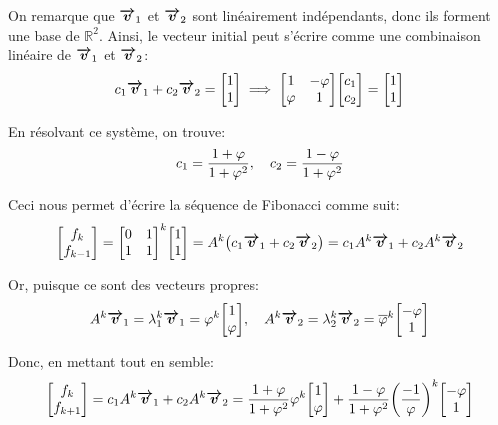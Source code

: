 \documentclass[a4paper]{article}
\begin{document}
{    On remarque que $\bm{\protect\overrightarrow{v}}_1$ et $\bm{\protect\overrightarrow{v}}_2$ sont linéairement indépendants, donc ils forment une base de $\mathbb{R}^2$. Ainsi, le vecteur initial peut s'écrire comme une combinaison linéaire de $\bm{\protect\overrightarrow{v}}_1$ et $\bm{\protect\overrightarrow{v}}_2$: 
    \[c_1 \bvec{v}_1 + c_2 \bvec{v}_2 = \begin{bmatrix} 1 \\ 1 \end{bmatrix} \implies \begin{bmatrix} 1 & -\phi \\ \phi & 1 \end{bmatrix} \begin{bmatrix} c_1 \\ c_2 \end{bmatrix} = \begin{bmatrix} 1 \\ 1 \end{bmatrix} \]

    En résolvant ce système, on trouve:
    \[c_1 = \frac{1 + \varphi}{1 + \varphi^2}, \quad c_2 = \frac{1 - \varphi}{1 + \varphi^2}\]
    
    Ceci nous permet d'écrire la séquence de Fibonacci comme suit: 
    \[\begin{bmatrix} f_{k} \\ f_{k-1} \end{bmatrix} = \begin{bmatrix} 0 & 1 \\ 1 & 1 \end{bmatrix}^{k} \begin{bmatrix} 1 \\ 1 \end{bmatrix} = A^k\left(c_1 \bvec{v}_1 + c_2 \bvec{v}_2\right) = c_1 A^{k} \bvec{v}_1 + c_2 A^{k} \bvec{v}_2\]
    
    Or, puisque ce sont des vecteurs propres: 
    \[A^{k} \bvec{v}_1 = \lambda_1^{k} \bvec{v}_1 = \phi^k \begin{bmatrix} 1 \\ \phi \end{bmatrix}, \mathspace A^k \bvec{v}_2 = \lambda_2^k \bvec{v}_2 = \bar{\phi}^{k} \begin{bmatrix} -\phi \\ 1 \end{bmatrix} \]

    Donc, en mettant tout en semble: 
    \[\begin{bmatrix} f_{k} \\ f_{k+1} \end{bmatrix} = c_1 A^{k} \bvec{v}_1 + c_2 A^{k} \bvec{v}_2 = \frac{1 + \phi}{1 + \phi^2} \phi^{k} \begin{bmatrix} 1 \\ \phi \end{bmatrix} + \frac{1 - \phi}{1 + \phi^2} \left(\frac{-1}{\phi}\right)^{k} \begin{bmatrix} -\phi \\ 1 \end{bmatrix} \]
    
}
\end{document}
